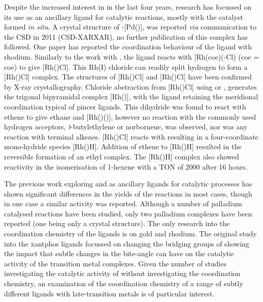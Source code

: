 Despite the increased interest in \tBuxantphos{} in the last four years, research has focussed on its use as an ancillary ligand for catalytic reactions, mostly with the catalyst formed \emph{in situ}.  A crystal structure of \trans-[Pd(\tBuxantphos)], was reported \emph{via} communication to the \gls{CSD} in 2011 (CSD-XARXAR), no further publication of this complex has followed.\cite{Allen2002}  One paper has reported the coordination behaviour of the \tBuxantphos{} ligand with rhodium.\cite{Haibach2013}  Similarly to the work with \iPrxantphos{}, the \tBuxantphos{} ligand reacts with [Rh(\acrshort{coe})(\hapto{}-Cl)\ce{]2} (\acrshort{coe} = \acrlong{coe}) to give [Rh(\tBuxantphosk)Cl].  This Rh(I) chloride can readily split hydrogen to form a [Rh(\tBuxantphosk)Cl] complex.  The structures of [Rh(\tBuxantphosk)Cl] and [Rh(\tBuxantphosk)Cl] have been confirmed by X-ray crystallography.  Chloride abstraction from [Rh(\tBuxantphosk)Cl] using  or , generates the trigonal bipyramidal complex [Rh(\tBuxantphosk)], with the \tBuxantphos{} ligand retaining the meridional coordination typical of pincer ligands.  This dihydride was found to react with ethene to give ethane and [Rh(\tBuxantphosk)()], however no reaction with the commonly used hydrogen acceptors, \emph{t}-butylethylene or norbornene, was observed, nor was any reaction with terminal alkenes.  [Rh(\tBuxantphosk)Cl] reacts with  resulting in a four-coordinate mono-hydride species [Rh(\tBuxantphos)H].  Addition of ethene to [Rh(\tBuxantphos)H] resulted in the reversible formation of an ethyl complex.  The [Rh(\tBuxantphos)H] complex also showed reactivity in the isomerisation of 1-hexene with a \gls{TON} of 2000 after 16 hours.  

The previous work exploring \tBuxantphos{} and \Phxantphos{} as ancillary ligands for catalytic processes has shown significant differences in the yields of the reactions in most cases, though in one case a similar activity was reported.  Although a number of palladium catalysed reactions have been studied, only two palladium complexes have been reported (one being only a crystal structure).  The only research into the coordination chemistry of the \tBuxantphos{} ligands is on gold and rhodium.\cite{Partyka2010, Haibach2013}  The original study into the xantphos ligands focussed on changing the bridging groups of \Phxantphos{} showing the impact that subtle changes in the bite-angle can have on the catalytic activity of the transition metal complexes.\cite{Kranenburg1995}  Given the number of studies investigating the catalytic activity of \tBuxantphos{} without investigating the coordination chemistry, an examination of the coordination chemistry of a range of subtly different \tBuxantphos{} ligands with late-transition metals is of particular interest.   

